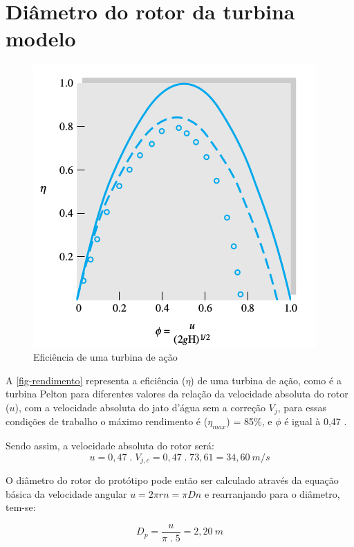\section{Diâmetro do rotor da turbina modelo}

    \begin{figure}[htb]
        \centering
        \caption{\label{fig-rendimento} Eficiência de uma turbina de ação}
        \includegraphics[scale=0.5]{images/eficiencia_pelton.png}
    \end{figure}

    A \autoref{fig-rendimento} representa a eficiência ($\eta$) de uma turbina de ação, como é a turbina Pelton para diferentes valores da relação da velocidade absoluta do rotor ($u$), com a velocidade absoluta do jato d'água sem a correção $V_j$, para essas condições de trabalho o máximo rendimento é ($\eta_{max}$) = 85\%, e $\phi$ é igual à 0,47 \cite{white}.

    Sendo assim, a velocidade absoluta do rotor será:
    \begin{equation*}
        u = 0,47 \; . \; V_{j,c} = 0,47 \; . \; 73,61 = 34,60 \: m/s
    \end{equation*}

    O diâmetro do rotor do protótipo pode então ser calculado através da equação básica da velocidade angular $u = 2 \pi r n = \pi D n$ e rearranjando para o diâmetro, tem-se:

    \begin{equation*}
        D_p = \frac{u}{\pi \; . \; 5} = 2,20\: m
    \end{equation*}

